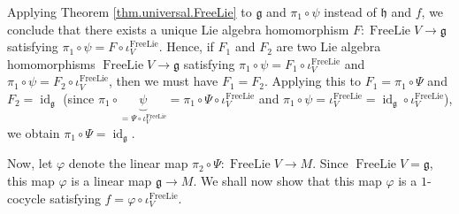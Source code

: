 \documentclass[etingof-lie.tex]{subfiles}
\begin{document}
\begin{verlong}
Applying Theorem \ref{thm.universal.FreeLie} to $\mathfrak{g}$ and $\pi
_{1}\circ\psi$ instead of $\mathfrak{h}$ and $f$, we conclude that there
exists a unique Lie algebra homomorphism $F:\operatorname*{FreeLie}%
V\rightarrow\mathfrak{g}$ satisfying $\pi_{1}\circ\psi=F\circ\iota
_{V}^{\operatorname*{FreeLie}}$. Hence, if $F_{1}$ and $F_{2}$ are two Lie
algebra homomorphisms $\operatorname*{FreeLie}V\rightarrow\mathfrak{g}$
satisfying $\pi_{1}\circ\psi=F_{1}\circ\iota_{V}^{\operatorname*{FreeLie}}$
and $\pi_{1}\circ\psi=F_{2}\circ\iota_{V}^{\operatorname*{FreeLie}}$, then we
must have $F_{1}=F_{2}$. Applying this to $F_{1}=\pi_{1}\circ\Psi$ and
$F_{2}=\operatorname*{id}\nolimits_{\mathfrak{g}}$ (since $\pi_{1}%
\circ\underbrace{\psi}_{=\Psi\circ\iota_{V}^{\operatorname*{FreeLie}}}=\pi
_{1}\circ\Psi\circ\iota_{V}^{\operatorname*{FreeLie}}$ and $\pi_{1}\circ
\psi=\iota_{V}^{\operatorname*{FreeLie}}=\operatorname*{id}%
\nolimits_{\mathfrak{g}}\circ\iota_{V}^{\operatorname*{FreeLie}}$), we obtain
$\pi_{1}\circ\Psi=\operatorname*{id}\nolimits_{\mathfrak{g}}$.

Now, let $\varphi$ denote the linear map $\pi_{2}\circ\Psi
:\operatorname*{FreeLie}V\rightarrow M$. Since $\operatorname*{FreeLie}%
V=\mathfrak{g}$, this map $\varphi$ is a linear map $\mathfrak{g}\rightarrow
M$. We shall now show that this map $\varphi$ is a $1$-cocycle satisfying
$f=\varphi\circ\iota_{V}^{\operatorname*{FreeLie}}$.


\end{verlong}
\end{document}
